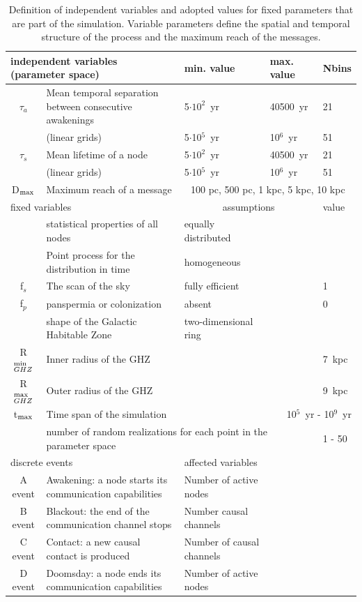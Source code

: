 \documentclass[crop]{CSLB}
\newcommand{\ceti}{node}
\newcommand{\cetis}{nodes}
\begin{document}
 \setlength{\tabcolsep}{10pt}
\begin{table}
\centering
\begin{tabular}{cllll}
\hline
   \multicolumn{2}{l}{independent variables (parameter space)}
   &min. value&max. value&Nbins\\
\hline
   $\tau_{a}$ & Mean temporal separation between consecutive awakenings 
	      & 5$\cdot10^2$~yr & 40500~yr & 21\\ 
	    & (linear grids) & 5$\cdot$10$^5$~yr & 10$^6$~yr & 51\\ 
   $\tau_{s}$ & Mean lifetime of a \ceti{}
	      & 5$\cdot10^2$~yr & 40500~yr & 21\\ 
	    & (linear grids) & 5$\cdot$10$^5$~yr & 10$^6$~yr & 51\\ 
	D$_{\rm max}$ & Maximum reach of a message  & \multicolumn{3}{c}{100 pc, 500 pc, 1 kpc, 5 kpc, 10 kpc} \\
\hline
   \multicolumn{2}{l}{fixed variables} & \multicolumn{2}{c}{assumptions} &value \\
\hline
   & statistical properties of all \cetis{} &equally distributed&&\\
   & Point process for the distribution in time & homogeneous &&\\
   f$_s$ & The scan of the sky & fully efficient&&1\\
   f$_p$ & panspermia or colonization &absent&&0\\
   & shape of the Galactic Habitable Zone & two-dimensional ring &&\\
	R$_{GHZ}^{\rm min}$   & Inner radius of the GHZ  & \citet{lineweaver_galactic_2004} & & 7~kpc\\
   R$_{GHZ}^{\rm max}$   & Outer radius of the GHZ       & \citet{lineweaver_galactic_2004} & & 9~kpc\\
	t$_{\rm max}$ & Time span of the simulation  & &
   \multicolumn{2}{r}{10$^5$~yr - 10$^9$~yr} \\
    & \multicolumn{3}{l}{number of random realizations for each point
    in the parameter space} & 1 - 50 \\
\hline
   \multicolumn{2}{l}{discrete events} &
   \multicolumn{3}{l}{affected variables}\\
\hline
   A event & Awakening: a \ceti{} starts its communication
   capabilities &Number of active \cetis{}\\
   B event & Blackout: the end of the communication channel stops
   &Number causal channels\\
   C event & Contact: a new causal contact is produced &Number of causal channels\\
   D event & Doomsday: a \ceti{} ends its communication capabilities&Number of active \cetis{}\\
\hline

\hline
\end{tabular}
\caption{Definition of independent variables and adopted values for 
   fixed parameters 
   that are part of the simulation.  Variable parameters define the
   spatial and temporal structure
   of the process and the maximum reach of the messages.}
\label{T_simu_hypotheses}
\end{table}
 
\end{document}
